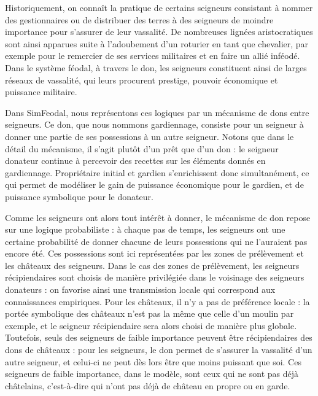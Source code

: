 Historiquement, on connaît la pratique de certains seigneurs consistant à nommer des gestionnaires ou de distribuer des terres à des seigneurs de moindre importance pour s'assurer de leur vassalité.
De nombreuses lignées aristocratiques sont ainsi apparues suite à l'adoubement d'un roturier en tant que chevalier, par exemple pour le remercier de ses services militaires et en faire un allié inféodé.
Dans le système féodal, à travers le don, les seigneurs constituent ainsi de larges réseaux de vassalité, qui leurs procurent prestige, pouvoir économique et puissance militaire.

\begin{tcolorbox}[breakable,left=0pt,right=0pt,top=0pt,bottom=0pt,
	colback=gray!15,colframe=gray!15,width=\dimexpr\textwidth\relax, 
	enlarge left by=0mm, boxsep=5pt,arc=0pt,outer arc=0pt]
	
	Dans SimFeodal, nous représentons ces logiques par un mécanisme de dons entre seigneurs.
	Ce don, que nous nommons \og gardiennage\fg{}, consiste pour un seigneur à donner une partie de ses possessions à un autre seigneur.
	Notons que dans le détail du mécanisme, il s'agit plutôt d'un prêt que d'un don : le seigneur donateur continue à percevoir des recettes sur les éléments donnés en gardiennage\footnotemark.
	Propriétaire initial et gardien s'enrichissent donc simultanément, ce qui permet de modéliser le gain de puissance économique pour le gardien, et de puissance symbolique pour le donateur.
	
	\medskip
	Comme les seigneurs ont alors tout intérêt à donner, le mécanisme de don repose sur une logique probabiliste : à chaque pas de temps, les seigneurs ont une certaine probabilité de donner chacune de leurs possessions qui ne l'auraient pas encore été.
	Ces possessions sont ici représentées par les zones de prélèvement et les châteaux des seigneurs.
	Dans le cas des zones de prélèvement, les seigneurs récipiendaires sont choisis de manière privilégiée dans le voisinage des seigneurs donateurs : on favorise ainsi une transmission locale qui correspond aux connaissances empiriques.
	Pour les châteaux, il n'y a pas de préférence locale : la portée symbolique des châteaux n'est pas la même que celle d'un moulin par exemple, et le seigneur récipiendaire sera alors choisi de manière plus globale.
	Toutefois, seuls des seigneurs de faible importance peuvent être récipiendaires des dons de châteaux :
	pour les seigneurs, le don permet de s'assurer la vassalité d'un autre seigneur, et celui-ci ne peut dès lors être que moins puissant que soi.
	Ces seigneurs de faible importance, dans le modèle, sont ceux qui ne sont pas déjà châtelains, c'est-à-dire qui n'ont pas déjà de château en propre ou en garde.
	

\end{tcolorbox}
